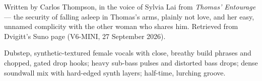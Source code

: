 
\begin{notes}
Written by Carlos Thompson, in the voice of Sylvia Lai from \emph{Thomas' Entourage} — the security of falling asleep in Thomas's arms, plainly not love, and her easy, unnamed complicity with the other woman who shares him. Retrieved from Dvigitt's Suno page (V6-MINI, 27 September 2026).
\end{notes}
\begin{style}
Dubstep, synthetic-textured female vocals with close, breathy build phrases and chopped, gated drop hooks; heavy sub-bass pulses and distorted bass drops; dense soundwall mix with hard-edged synth layers; half-time, lurching groove.
\end{style}
